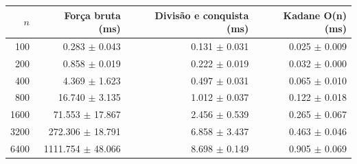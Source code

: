 \begin{tabular}{rrrr}
\hline
$n$ & Força bruta (ms) & Divisão e conquista (ms) & Kadane O(n) (ms) \\
\hline
100 & 0.283 $\pm$ 0.043 & 0.131 $\pm$ 0.031 & 0.025 $\pm$ 0.009 \\
200 & 0.858 $\pm$ 0.019 & 0.222 $\pm$ 0.019 & 0.032 $\pm$ 0.000 \\
400 & 4.369 $\pm$ 1.623 & 0.497 $\pm$ 0.031 & 0.065 $\pm$ 0.010 \\
800 & 16.740 $\pm$ 3.135 & 1.012 $\pm$ 0.037 & 0.122 $\pm$ 0.018 \\
1600 & 71.553 $\pm$ 17.867 & 2.456 $\pm$ 0.539 & 0.265 $\pm$ 0.067 \\
3200 & 272.306 $\pm$ 18.791 & 6.858 $\pm$ 3.437 & 0.463 $\pm$ 0.046 \\
6400 & 1111.754 $\pm$ 48.066 & 8.698 $\pm$ 0.149 & 0.905 $\pm$ 0.069 \\
\hline
\end{tabular}
